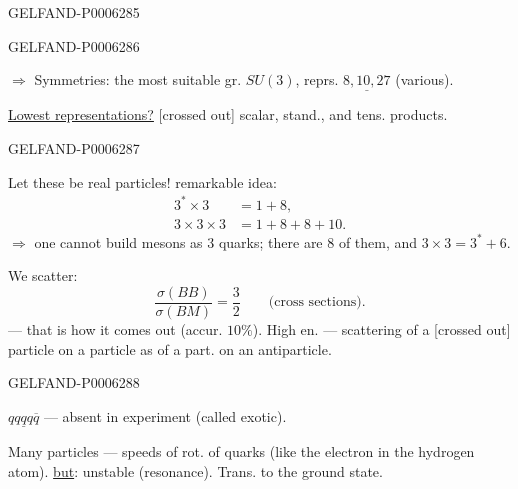 \begin{GelfandAdjacentEvidence}{GELFAND-P000628}{5}

\end{GelfandAdjacentEvidence}
\begin{GelfandAdjacentEvidence}{GELFAND-P000628}{6}

\(\Rightarrow\) Symmetries: the most suitable gr. \(SU(3)\),
reprs. \(\underline{8,10,27}\) (various).

\underline{Lowest representations?} [crossed out] scalar, stand., and tens. products.
\end{GelfandAdjacentEvidence}
\begin{GelfandAdjacentEvidence}{GELFAND-P000628}{7}

Let these be real particles! remarkable idea:
\[
\begin{aligned}
3^*\times3&=1+8,\\
3\times3\times3&=1+8+8+10.
\end{aligned}
\]
\(\Rightarrow\) one cannot build mesons as 3 quarks; there are 8 of them, and \(3\times3=3^*+6\).

We scatter:
\[
\frac{\sigma(BB)}{\sigma(BM)}=\frac32
\qquad\text{(cross sections)}.
\]
--- that is how it comes out (accur. \(10\%\)).
High en. --- scattering of a [crossed out] particle on a particle as of a part. on an antiparticle.
\end{GelfandAdjacentEvidence}
\begin{GelfandAdjacentEvidence}{GELFAND-P000628}{8}


\(\underline{qqqq\overline q}\) --- absent in experiment (called exotic).

Many particles --- speeds of rot. of quarks (like the electron in the hydrogen atom).
\underline{but}: unstable (resonance). Trans. to the ground state.
\end{GelfandAdjacentEvidence}
